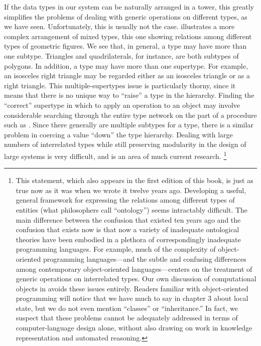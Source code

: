 If the data types in our system can be naturally arranged in a tower, this greatly simplifies the problems of dealing with generic operations on different types, as we have seen.
Unfortunately, this is usually not the case.
 illustrates a more complex arrangement of mixed types, this one showing relations among different types of geometric figures.
We see that, in general, a type may have more than one subtype.
Triangles and quadrilaterals, for instance, are both subtypes of polygons.
In addition, a type may have more than one supertype.
For example, an isosceles right triangle may be regarded either as an isosceles triangle or as a right triangle.
This multiple-supertypes issue is particularly thorny, since it means that there is no unique way to “raise” a type in the hierarchy.
Finding the “correct” supertype in which to apply an operation to an object may involve considerable searching through the entire type network on the part of a procedure such as .
Since there generally are multiple subtypes for a type, there is a similar problem in coercing a value “down” the type hierarchy.
Dealing with large numbers of interrelated types while still preserving modularity in the design of large systems is very difficult, and is an area of much current research.%
\footnote{
	This statement, which also appears in the first edition of this book, is just as true now as it was when we wrote it twelve years ago.
	Developing a useful, general framework for expressing the relations among different types of entities (what philosophers call “ontology”) seems intractably difficult.
	The main difference between the confusion that existed ten years ago and the confusion that exists now is that now a variety of inadequate ontological theories have been embodied in a plethora of correspondingly inadequate programming languages.
	For example, much of the complexity of object-oriented programming languages---and the subtle and confusing differences among contemporary object-oriented languages---centers on the treatment of generic operations on interrelated types.
	Our own discussion of computational objects in  avoids these issues entirely.
	Readers familiar with object-oriented programming will notice that we have much to say in chapter 3 about local state, but we do not even mention “classes” or “inheritance.”
	In fact, we suspect that these problems cannot be adequately addressed in terms of computer-language design alone, without also drawing on work in knowledge representation and automated reasoning.
}




